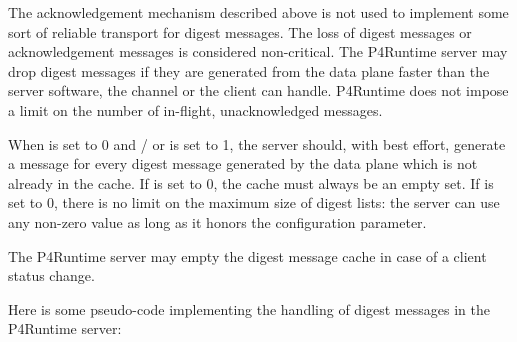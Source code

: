 \documentclass[11pt]{article}
\begin{document}
{%
The acknowledgement mechanism described above is not used to implement some sort
of reliable transport for digest messages. The loss of digest messages or
acknowledgement messages is considered non-critical. The P4Runtime server may
drop digest messages if they are generated from the data plane faster than the
server software, the channel or the client can handle. P4Runtime does not impose
a limit on the number of in-flight, unacknowledged  messages.%

When  is set to 0 and / or  is set to 1, the
server should, with best effort, generate a  message for every
digest message generated by the data plane which is not already in the cache. If
 is set to 0, the cache must always be an empty set. If
 is set to 0, there is no limit on the maximum size of digest
lists: the server can use any non-zero value as long as it honors the
 configuration parameter.%

The P4Runtime server may empty the digest message cache in case of a client
status change.%

Here is some pseudo-code implementing the handling of digest messages in the
P4Runtime server:%

}
\end{document}
